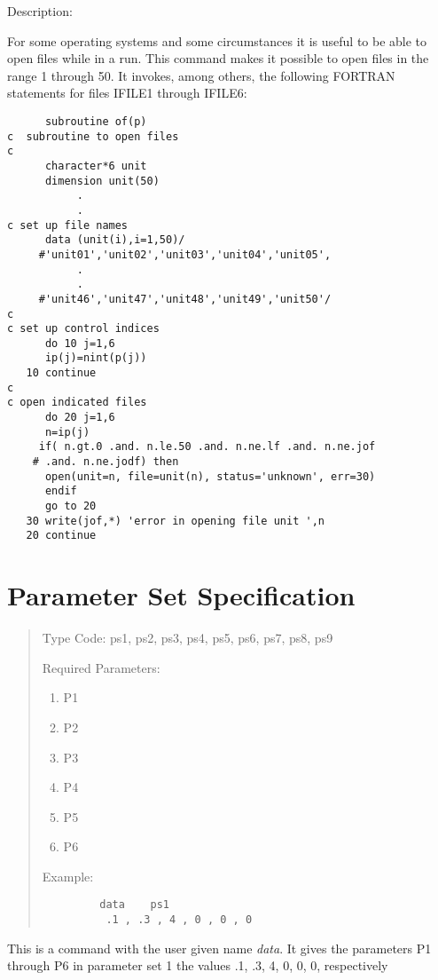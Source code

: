 \vspace{5mm}
     Description:
\vspace{2mm}

For some operating systems and some circumstances it is useful to be able to open files while in a \Mary run.  This command makes it possible to open files in the range 1 through 50.  It invokes, among others, the following FORTRAN statements for files IFILE1
through IFILE6:
\begin{footnotesize}
\begin{verbatim}
      subroutine of(p)
c  subroutine to open files
c
      character*6 unit
      dimension unit(50)
           .
           .
c set up file names
      data (unit(i),i=1,50)/
     #'unit01','unit02','unit03','unit04','unit05',
           .
           .
     #'unit46','unit47','unit48','unit49','unit50'/
c
c set up control indices
      do 10 j=1,6
      ip(j)=nint(p(j))
   10 continue
c
c open indicated files
      do 20 j=1,6
      n=ip(j)
     if( n.gt.0 .and. n.le.50 .and. n.ne.lf .and. n.ne.jof
    # .and. n.ne.jodf) then
      open(unit=n, file=unit(n), status='unknown', err=30)
      endif
      go to 20
   30 write(jof,*) 'error in opening file unit ',n
   20 continue
\end{verbatim}
\end{footnotesize}

\newpage
\section{Parameter Set Specification}
\begin{quotation}
\noindent Type Code:  ps1, ps2, ps3, ps4, ps5, ps6, ps7, ps8, ps9
\vspace{5mm}

\noindent Required Parameters:
\begin{enumerate}
      \item  P1
      \item  P2
      \item  P3
      \item  P4
      \item  P5
      \item  P6
\end{enumerate}

\vspace{5mm}
\noindent     Example:
\begin{verbatim}
         data    ps1
          .1 , .3 , 4 , 0 , 0 , 0
\end{verbatim}
\end{quotation}
This is a command with the user given name {\em data}.  It gives the
parameters P1 through P6 in parameter set 1 the values .1, .3, 4, 0, 0, 0,
respectively

